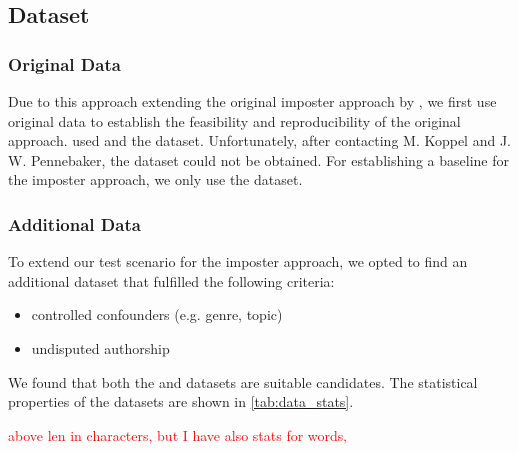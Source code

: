 \subsection{Dataset}
\label{subsec:dataset}

\subsubsection{Original Data}
Due to this approach extending the original imposter approach by \citet{koppel_determining_2014}, 
we first use original data to establish the feasibility and reproducibility of the original approach. 
\citet{koppel_determining_2014} used \dataBlog{} and the \dataStudent{} dataset.
Unfortunately, after contacting M. Koppel and J. W. Pennebaker, the \dataStudent{} dataset could not be obtained.
For establishing a baseline for the imposter approach, we only use the \dataBlog{} dataset.

\subsubsection{Additional Data}
To extend our test scenario for the imposter approach, we opted to find an additional dataset that fulfilled the following criteria:
\begin{itemize}
    \item controlled confounders (e.g. genre, topic)
    \item undisputed authorship 
    
\end{itemize}

We found that both the \dataPan{} and \dataGutenberg{} datasets are suitable candidates.
The statistical properties of the datasets are shown in \autoref{tab:data_stats}.

\begin{table}[h]
\centering\small
\caption{Statistics of preprocessed datasets \dataPan{}, \dataBlog{} and \dataGutenberg{}.}
\label{tab:data_stats}
\end{table}
\textcolor{red}{above len in characters, but I have also stats for words‚}


